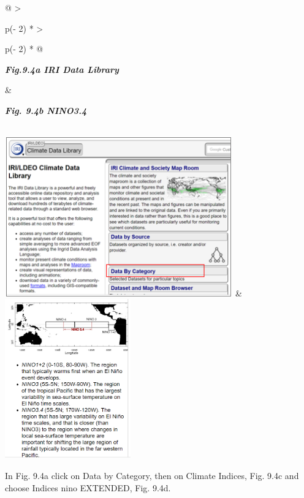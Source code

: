 \documentclass[
  letterpaper,
  DIV=11,
  numbers=noendperiod]{scrreprt}
\begin{document}
\begin{longtable}[]{@{}
  >{\raggedright\arraybackslash}p{(\columnwidth - 2\tabcolsep) * }
  >{\raggedright\arraybackslash}p{(\columnwidth - 2\tabcolsep) * }@{}}
\toprule\noalign{}
\begin{minipage}[b]{\linewidth}\raggedright
\textbf{\emph{Fig.9.4a IRI Data Library}}
\end{minipage} & \begin{minipage}[b]{\linewidth}\raggedright
\textbf{\emph{Fig. 9.4b NINO3.4}}
\end{minipage} \\
\midrule\noalign{}
\endhead
\bottomrule\noalign{}
\endlastfoot
\includegraphics[width=3.86687in,height=2.70544in]{figures/Fig9.4a.png}
&
\includegraphics[width=2.13099in,height=2.70683in]{figures/Fig9.4b.png} \\
\end{longtable}

In Fig. 9.4a click on Data by Category, then on Climate Indices, Fig.
9.4c and choose Indices nino EXTENDED, Fig. 9.4d.
\end{document}
